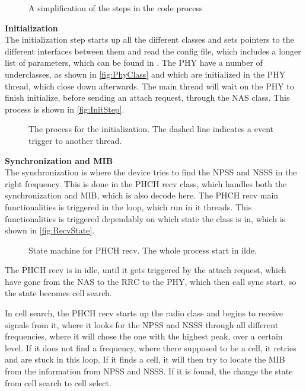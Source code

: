 \begin{figure}[H]
\centering
{}
\resizebox{0.5\textwidth}{!}{
}
\caption{A simplification of the steps in the code process}
\label{fig:MassStep}
\end{figure}

\textbf{Initialization} \\
The initialization step starts up all the different classes and sets pointers to the different interfaces between them and read the config file, which includes a longer list of parameters, which can be found in . The PHY have a number of underclasses, as shown in \autoref{fig:PhyClass} and which are initialized in the PHY thread, which close down afterwards. The main thread will wait on the PHY to finish initialize, before sending an attach request, through the NAS class. This process is shown in \autoref{fig:InitStep}.

\begin{figure}[H]
\centering
{}
\resizebox{0.5\textwidth}{!}{
}
\caption{The process for the initialization. The dashed line indicates a event trigger to another thread.}
\label{fig:InitStep}
\end{figure}


\textbf{Synchronization and MIB} \\
The synchronization is where the device tries to find the NPSS and NSSS in the right frequency. This is done in the PHCH recv class, which handles both the synchronization and MIB, which is also decode here. The PHCH recv main functionalities is triggered in the loop, which run in it threads. This functionalities is triggered dependably on which state the class is in, which is shown in \autoref{fig:RecvState}.

\begin{figure}[H]
\centering
{}
\resizebox{0.5\textwidth}{!}{
}
\caption{State machine for PHCH recv. The whole process start in ilde.}
\label{fig:RecvState}
\end{figure}

The PHCH recv is in idle, until it gets triggered by the attach request, which have gone from the NAS to the RRC to the PHY, which then call sync start, so the state becomes cell search.

In cell search, the PHCH recv starts up the radio class and begins to receive signals from it, where it looks for the NPSS and NSSS through all different frequencies, where it will chose the one with the highest peak, over a certain level. If it does not find a frequency, where there supposed to be a cell, it retries and are stuck in this loop. If it finds a cell, it will then try to locate the MIB from the information from NPSS and NSSS. If it is found, the change the state from cell search to cell select.

